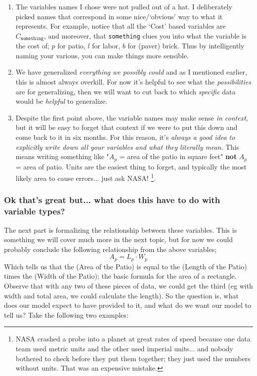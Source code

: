 \begin{enumerate}
\item The variables names I chose were not pulled out of a hat. I deliberately picked names that correspond in some nice/`obvious' way to what it represents. For example, notice that all the `Cost' based variables are $C_{\texttt{something}}$, and moreover, that \texttt{something} clues you into what the variable is the cost of; $p$ for patio, $l$ for labor, $b$ for (paver) brick. Thus by intelligently naming your various, you can make things more sensible.
\item We have generalized \textit{everything we possibly could} and as I mentioned earlier, this is almost always overkill. For now it's helpful to see what the \textit{possibilities} are for generalizing, then we will want to cut back to which \textit{specific} data would be \textit{helpful} to generalize.
\item Despite the first point above, the variable names may make sense \textit{in context}, but it will be easy to forget that context if we were to put this down and come back to it in six months. For this reason, it's \textit{always a good idea to explicitly write down all your variables and what they literally mean}. This means writing something like "$A_p$ = area of the patio in square feet" \textbf{not} $A_p$ = area of patio. Units are the easiest thing to forget, and typically the most likely area to cause errors... just ask NASA!%
\footnote{NASA crashed a probe into a planet at great rates of speed because one data team used metric units and the other used imperial units... and nobody bothered to check before they put them together; they just used the numbers without units. That was an expensive mistake.}.
\end{enumerate}

\subsubsection*{Ok that's great but... what does this have to do with variable types?}
The next part is formalizing the relationship between these variables. This is something we will cover much more in the next topic, but for now we could probably conclude the following relationship from the above variables;
\[
A_p = L_p \cdot W_p
\]
Which tells us that the (Area of the Patio) is equal to the (Length of the Patio) times the (Width of the Patio); the basic formula for the area of a rectangle. Observe that with any two of these pieces of data, we could get the third (eg with width and total area, we could calculate the length). So the question is, what does our model expect to have provided to it, and what do we want our model to tell us? Take the following two examples:

